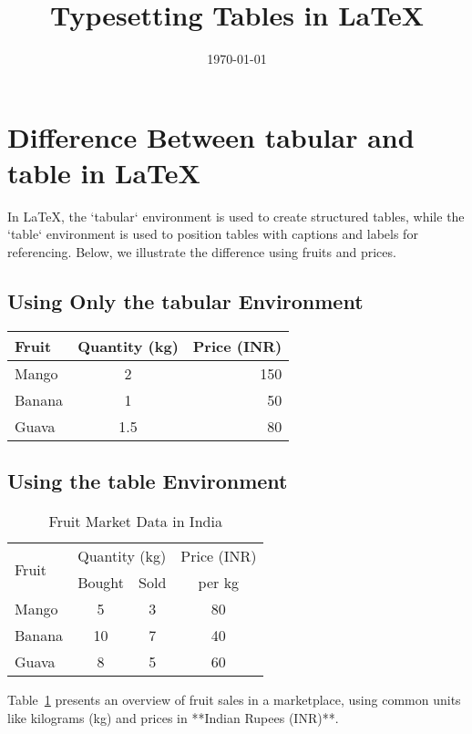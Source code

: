 \documentclass{article}
\begin{document}
\title{Typesetting Tables in \LaTeX}
\date{\today}
\maketitle

\section{Difference Between tabular and table in LaTeX}

In \LaTeX, the `tabular` environment is used to create structured tables, while the `table` environment is used to position tables with captions and labels for referencing. Below, we illustrate the difference using fruits and prices.

\subsection{Using Only the tabular Environment}
\begin{center}
    \begin{tabular}{|l|c|r|}
        \hline
        Fruit       & Quantity (kg) & Price (INR) \\
        \hline
        Mango       & 2  & 150  \\
        Banana      & 1  & 50   \\
        Guava       & 1.5  & 80  \\
        \hline
    \end{tabular}
\end{center}

\subsection{Using the table Environment}
\begin{table}[h]
    \centering
    \begin{tabular}{|l|c|c|c|}
        \hline
        \multirow{2}{*}{Fruit} & \multicolumn{2}{c|}{Quantity (kg)} & Price (INR) \\  
        \cline{2-3} %
        & Bought & Sold & per kg \\  
        \hline
        Mango   & 5  & 3  & 80   \\
        Banana  & 10 & 7  & 40   \\
        Guava   & 8  & 5  & 60   \\
        \hline
    \end{tabular}
    \caption{Fruit Market Data in India}
    \label{tab:fruit}
\end{table}

Table~\ref{tab:fruit} presents an overview of fruit sales in a marketplace, using common units like kilograms (kg) and prices in **Indian Rupees (INR)**.
\end{document}
